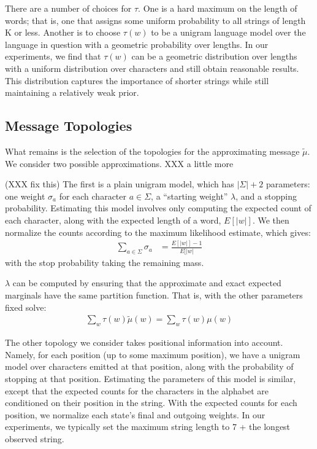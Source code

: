 \documentclass[11pt,a4paper]{article}
\begin{document}
There are a number of choices for $\tau$. One is a hard maximum on
the length of words; that is, one that assigns some uniform probability
to all strings of length K or less. Another is to choose $\tau(w)$
to be a unigram language model over the language in question with
a geometric probability over lengths. In our experiments, we find
that $\tau(w)$ can be a geometric distribution over lengths with a
uniform distribution over characters and still obtain reasonable
results.  This distribution captures the importance of shorter
strings while still maintaining a relatively weak prior.

\subsection{Message Topologies}

What remains is the selection of the topologies for the approximating
message $\tilde\mu$. We consider two possible approximations. XXX
a little more

(XXX fix this)
The first is a plain unigram model, which has $|\Sigma|+2$ parameters:
one weight $\sigma_a$ for each character $a \in \Sigma$, a ``starting
weight'' $\lambda$, and a stopping probability. Estimating this
model involves only computing the expected count of each character,
along with the expected length of a word, $E[|w|]$. We then normalize
the counts according to the maximum likelihood estimate, which
gives: 
\begin{equation}
  \begin{split}
    \sum_{a\in\Sigma} \sigma_a &= \frac{E[|w|]-1}{E[|w|}
   \end{split}
 \end{equation}
with the stop probability taking the remaining mass. 

$\lambda$ can be computed by ensuring that the
approximate and exact expected marginals have the same partition
function. That is, with the other parameters fixed solve:
\begin{equation*}
  \begin{split}
    \sum_w \tau(w) \tilde\mu(w) = \sum_w \tau(w) \mu(w)
  \end{split}
\end{equation*}

The other topology we consider takes positional information into
account. Namely, for each position (up to some maximum position),
we have a unigram model over characters emitted at that position,
along with the probability of stopping at that position. Estimating
the parameters of this model is similar, except that the expected
counts for the characters in the alphabet are conditioned on their
position in the string. With the expected counts for each position,
we normalize each state's final and outgoing weights. In our
experiments, we typically set the maximum string length to 7 + the
longest observed string.
\end{document}

